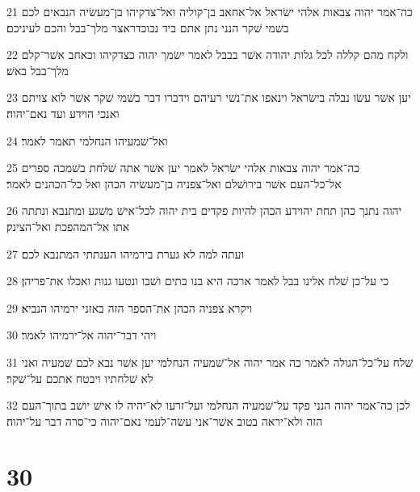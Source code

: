 \par 21 כה־אמר יהוה צבאות אלהי ישׂראל אל־אחאב בן־קוליה ואל־צדקיהו בן־מעשׂיה הנבאים לכם בשׁמי שׁקר הנני נתן אתם ביד נבוכדראצר מלך־בבל והכם לעיניכם׃
\par 22 ולקח מהם קללה לכל גלות יהודה אשׁר בבבל לאמר ישׂמך יהוה כצדקיהו וכאחב אשׁר־קלם מלך־בבל באשׁ׃
\par 23 יען אשׁר עשׂו נבלה בישׂראל וינאפו את־נשׁי רעיהם וידברו דבר בשׁמי שׁקר אשׁר לוא צויתם ואנכי הוידע ועד נאם־יהוה׃
\par 24 ואל־שׁמעיהו הנחלמי תאמר לאמר׃
\par 25 כה־אמר יהוה צבאות אלהי ישׂראל לאמר יען אשׁר אתה שׁלחת בשׁמכה ספרים אל־כל־העם אשׁר בירושׁלם ואל־צפניה בן־מעשׂיה הכהן ואל כל־הכהנים לאמר׃
\par 26 יהוה נתנך כהן תחת יהוידע הכהן להיות פקדים בית יהוה לכל־אישׁ משׁגע ומתנבא ונתתה אתו אל־המהפכת ואל־הצינק׃
\par 27 ועתה למה לא גערת בירמיהו הענתתי המתנבא לכם׃
\par 28 כי על־כן שׁלח אלינו בבל לאמר ארכה היא בנו בתים ושׁבו ונטעו גנות ואכלו את־פריהן׃
\par 29 ויקרא צפניה הכהן את־הספר הזה באזני ירמיהו הנביא׃
\par 30 ויהי דבר־יהוה אל־ירמיהו לאמר׃
\par 31 שׁלח על־כל־הגולה לאמר כה אמר יהוה אל־שׁמעיה הנחלמי יען אשׁר נבא לכם שׁמעיה ואני לא שׁלחתיו ויבטח אתכם על־שׁקר׃
\par 32 לכן כה־אמר יהוה הנני פקד על־שׁמעיה הנחלמי ועל־זרעו לא־יהיה לו אישׁ יושׁב בתוך־העם הזה ולא־יראה בטוב אשׁר־אני עשׂה־לעמי נאם־יהוה כי־סרה דבר על־יהוה׃

\chapter{30}

